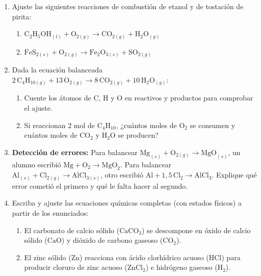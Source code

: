 \documentclass[12pt, letterpaper]{article}
\begin{document}
\begin{enumerate}[leftmargin=*, start=1]
  \item \medio{}\hspace{0.55em}Ajuste las siguientes reacciones de combustión de etanol y de tostación de pirita:
        \begin{enumerate}[label=\alph*), leftmargin=1.8em, nosep, topsep=2pt]
          \item $\text{C}_2\text{H}_5\text{OH}_{(l)} + \text{O}_{2(g)} \longrightarrow \text{CO}_{2(g)} + \text{H}_2\text{O}_{(g)}$
          \item $\text{FeS}_{2(s)} + \text{O}_{2(g)} \longrightarrow \text{Fe}_2\text{O}_{3(s)} + \text{SO}_{2(g)}$
        \end{enumerate}

  \item \dificil{}\hspace{0.55em}Dada la ecuación balanceada $2\,\text{C}_4\text{H}_{10(g)} + 13\,\text{O}_{2(g)} \longrightarrow 8\,\text{CO}_{2(g)} + 10\,\text{H}_2\text{O}_{(g)}$:
        \begin{enumerate}[label=\alph*), leftmargin=1.8em, nosep, topsep=2pt]
          \item Cuente los átomos de C, H y O en reactivos y productos para comprobar el ajuste.
          \item Si reaccionan $2\text{ mol}$ de $\text{C}_4\text{H}_{10}$, ¿cuántos moles de $\text{O}_2$ se consumen y cuántos moles de $\text{CO}_2$ y $\text{H}_2\text{O}$ se producen?
        \end{enumerate}

  \item \dificil{}\hspace{0.55em}\textbf{Detección de errores:} Para balancear $\text{Mg}_{(s)} + \text{O}_{2(g)} \longrightarrow \text{MgO}_{(s)}$, un alumno escribió $\text{Mg} + \text{O}_2 \longrightarrow \text{MgO}_2$. Para balancear $\text{Al}_{(s)} + \text{Cl}_{2(g)} \longrightarrow \text{AlCl}_{3(s)}$, otro escribió $\text{Al} + 1{,}5\,\text{Cl}_2 \longrightarrow \text{AlCl}_3$. Explique qué error cometió el primero y qué le falta hacer al segundo.

  \item \dificil{}\hspace{0.55em}Escriba y ajuste las ecuaciones químicas completas (con estados físicos) a partir de los enunciados:
        \begin{enumerate}[label=\alph*), leftmargin=1.8em, nosep, topsep=2pt]
          \item El carbonato de calcio sólido ($\text{CaCO}_3$) se descompone en óxido de calcio sólido ($\text{CaO}$) y dióxido de carbono gaseoso ($\text{CO}_2$).
          \item El zinc sólido ($\text{Zn}$) reacciona con ácido clorhídrico acuoso ($\text{HCl}$) para producir cloruro de zinc acuoso ($\text{ZnCl}_2$) e hidrógeno gaseoso ($\text{H}_2$).
        \end{enumerate}

\end{enumerate}
\end{document}
